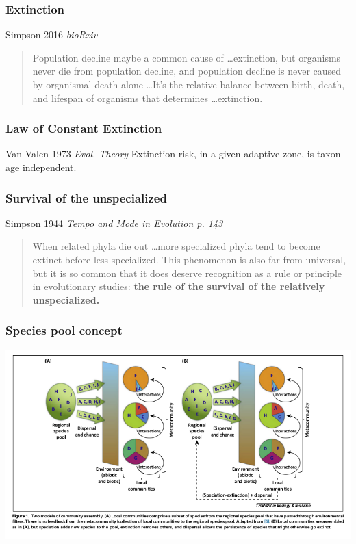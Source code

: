 \documentclass{beamer}
\begin{document}
\begin{frame}
  \frametitle{Extinction}


  \begin{block}{Simpson 2016 \em{bioRxiv}}
    \begin{quote}
      Population decline maybe a common cause of \dots extinction, but organisms never die from population decline, and population decline is never caused by organismal death alone \dots It's the relative balance between birth, death, and lifespan of organisms that determines \dots extinction. 
    \end{quote}
  \end{block}

\end{frame}

\begin{frame}
  \frametitle{Law of Constant Extinction}

  \begin{alertblock}{Van Valen 1973 \em{Evol. Theory}}
    Extinction risk, in a given adaptive zone, is taxon--age independent.
  \end{alertblock}

\end{frame}

\begin{frame}
  \frametitle{Survival of the unspecialized}
  \begin{alertblock}{Simpson 1944 \em{Tempo and Mode in Evolution} p. 143}
    \begin{quote}
      When related phyla die out \dots more specialized phyla tend to become extinct before less specialized. This phenomenon is also far from universal, but it is so common that it does deserve recognition as a rule or principle in evolutionary studies: \textbf{the rule of the survival of the relatively unspecialized.}
    \end{quote}
  \end{alertblock}

\end{frame}


\begin{frame}
  \frametitle{Species pool concept}

  \begin{center}
    \includegraphics[height=0.8\textheight,width=\textwidth,keepaspectratio=true]{figure/schemske_pool}
  \end{center}

  \tiny{}
\end{frame}
\end{document}
